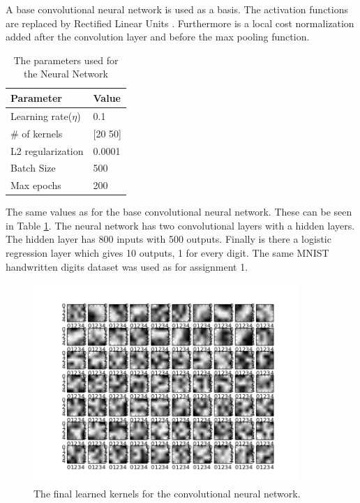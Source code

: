
A base convolutional neural network is used as a basis. The activation functions are replaced by Rectified Linear Units . Furthermore is a local cost normalization added after the convolution layer and before the max pooling function. 

\begin{table}[ht!]
\centering
\begin{tabular}{ll}
\textbf{Parameter}           & \textbf{Value} \\ \hline  
Learning rate($\eta$) & 0.1   \\
\# of kernels   		& [20 50]   \\
L2 regularization   & 0.0001 \\
Batch Size          & 500     \\
Max epochs          & 200   \\   
\end{tabular}
\caption{The parameters used for the Neural Network}
\label{parameters2}
\end{table}

The same values as for the base convolutional neural network. These can be seen in Table \ref{parameters2}. The neural network has two convolutional layers with a hidden layers. The hidden layer has 800 inputs with 500 outputs. Finally is there a logistic regression layer which gives 10 outputs, 1 for every digit. The same MNIST handwritten digits dataset was used as for assignment 1.


\begin{figure}[ht!]
	\centering
	\includegraphics[width=0.9\textwidth]{./img/Exercise2/Afterlearning.png}	
	\caption{The final learned kernels for the convolutional neural network.}
	\label{fig:2:learningKernels}
\end{figure}

